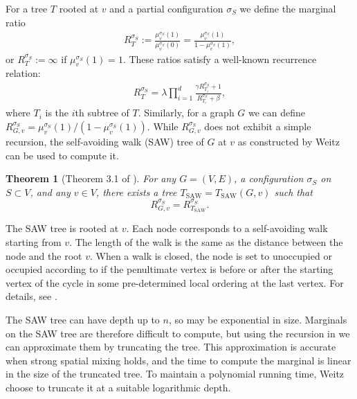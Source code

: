 \documentclass[11pt,a4paper]{amsart}
\newcommand{\defeq}{:=}
\newtheorem{theorem}{Theorem}
\theoremstyle{definition}
\theoremstyle{remark}
\newcommand{\TSAW}{T_{\mathrm{SAW}}}
\begin{document}
For a tree $T$ rooted at $v$ and a partial configuration $\sigma_S$ we define the marginal ratio
\begin{align*}
  R_T^{\sigma_S}\defeq\frac{\mu_v^{\sigma_S}(1)}{\mu_v^{\sigma_S}(0)}=\frac{\mu_v^{\sigma_S}(1)}{1-\mu_v^{\sigma_S}(1)},
\end{align*}
or $R_T^{\sigma_S}\defeq\infty$ if $\mu_v^{\sigma_S}(1)=1$.
These ratios satisfy a well-known recurrence relation:
\begin{align}
\label{saw-recursion}
R_T^{\sigma_S}=\lambda\prod_{i=1}^d\frac{\gamma R_{T_i}^{\sigma_S}+1}{R_{T_i}^{\sigma_S}+\beta},
\end{align}
where $T_i$ is the $i$th subtree of $T$. Similarly, for a graph $G$ we can define $R_{G,v}^{\sigma_S}=\mu_v^{\sigma_S}(1)/(1-\mu_v^{\sigma_S}(1))$.
While $R_{G,v}^{\sigma_S}$ does not exhibit a simple recursion, the self-avoiding walk (SAW) tree of $G$ at $v$ as constructed by Weitz \cite{Wei06} can be used to compute it. 

\begin{theorem}[Theorem 3.1 of \cite{Wei06}]
\label{saw-theorem}
For any $G=(V,E)$, a configuration $\sigma_S$ on $S\subset V$, and any $v\in V$, there exists a tree $\TSAW=\TSAW(G,v)$ such that
\[R_{G,v}^{\sigma_S}=R_{\TSAW}^{\sigma_S}.\]
\end{theorem}

The SAW tree is rooted at $v$.
Each node corresponds to a self-avoiding walk starting from $v$. The length of the walk is the same as the distance between the node and the root $v$.
When a walk is closed, the node is set to unoccupied or occupied according to if the penultimate vertex is before or after the starting vertex of the cycle in some pre-determined local ordering at the last vertex.
For details, see \cite{Wei06}.

The SAW tree can have depth up to $n$, so may be exponential in size. Marginals on the SAW tree are therefore difficult to compute, but using the recursion in  we can approximate them by truncating the tree. 
This approximation is accurate when strong spatial mixing holds,
and the time to compute the marginal is linear in the size of the truncated tree.
To maintain a polynomial running time, Weitz~\cite{Wei06} choose to truncate it at a suitable logarithmic depth.

\end{document}
